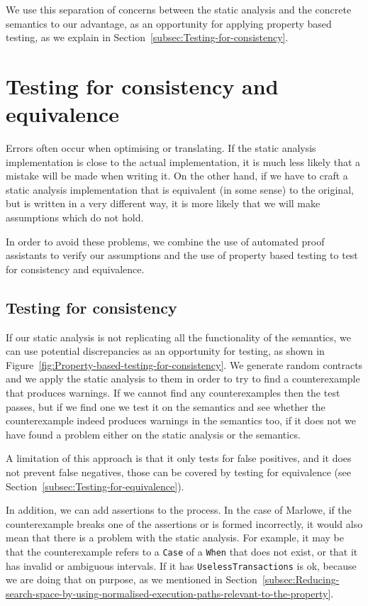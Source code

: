 \documentclass[english,runningheads]{llncs}
\begin{document}
We use this separation of concerns between the static analysis and
the concrete semantics to our advantage, as an opportunity for applying
property based testing, as we explain in Section~\ref{subsec:Testing-for-consistency}.

\section{Testing for consistency and equivalence\label{sec:Testing}}

Errors often occur when optimising or translating. If the static analysis
implementation is close to the actual implementation, it is much less
likely that a mistake will be made when writing it. On the other hand,
if we have to craft a static analysis implementation that is equivalent
(in some sense) to the original, but is written in a very different
way, it is more likely that we will make assumptions which do not
hold.

In order to avoid these problems, we combine the use of automated proof
assistants to verify our assumptions and the use of property based testing to
test for consistency and equivalence.

\subsection{Testing for consistency\label{subsec:Testing-for-consistency} }

If our static analysis is not replicating all the functionality of
the semantics, we can use potential discrepancies as an opportunity
for testing, as shown in Figure~\ref{fig:Property-based-testing-for-consistency}.
We generate random contracts and we apply the static analysis to them
in order to try to find a counterexample that produces warnings. If
we cannot find any counterexamples then the test passes, but if we
find one we test it on the semantics and see whether the counterexample
indeed produces warnings in the semantics too, if it does not we have
found a problem either on the static analysis or the semantics.

A limitation of this approach is that it only tests for false positives,
and it does not prevent false negatives, those can be covered by testing
for equivalence (see Section~\ref{subsec:Testing-for-equivalence}).

In addition, we can add assertions to the process. In the case of
Marlowe, if the counterexample breaks one of the assertions or is
formed incorrectly, it would also mean that there is a problem with
the static analysis. For example, it may be that the counterexample
refers to a \texttt{Case} of a \texttt{When} that does not exist,
or that it has invalid or ambiguous intervals. If it has \texttt{UselessTransactions}
is ok, because we are doing that on purpose, as we mentioned in Section~\ref{subsec:Reducing-search-space-by-using-normalised-execution-paths-relevant-to-the-property}.
\end{document}
